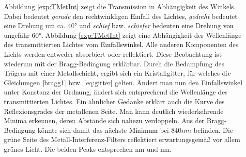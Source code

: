         Abbildung \ref{exp:TMetInt} zeigt die Transmission in Abhängigkeit des Winkels. Dabei bedeutet \textit{gerade} den rechtwinkligen Einfall des Lichtes, \textit{gedreht} bedeutet eine Drehung um ca. $40\unit{°}$ und \textit{schief} bzw. \textit{schiefer} bedeuten eine Drehung von ungefähr $60\unit{°}$. Abbildung \ref{exp:TMetInt} zeigt eine Abhängigkeit der Wellenlänge des transmittierten Lichtes vom Einfallswinkel. Alle anderen Komponenten des Lichts werden entweder absorbiert oder reflektiert. Diese Beobachtung ist wiederum mit der Bragg-Bedingung erklärbar. Durch die Bedampfung des Trägers mit einer Metallschicht, ergibt sich ein Kristallgitter, für welches die Gleichungen \ref{bragg1} bzw. \ref{eq:gitter} gelten. Ändert man nun den Einfallswinkel unter Konstanz der Ordnung, ändert sich entsprechend die Wellenlänge des transmittierten Lichtes.
        Ein ähnlicher Gedanke erklärt auch die Kurve des Reflexionsgrades der metallenen Seite. Man kann deutlich wiederkehrende Minima erkennen, deren Abstände sich nahezu verdoppeln. Aus der Bragg-Bedingung könnte sich damit das nächste Minimum bei $840\unit{nm}$ befinden.
        Die grüne Seite des Metall-Interferenz-Filters reflektiert erwartungsgemäß vor allem grünes Licht. Die beiden Peaks entsprechen \unit[525]{nm} und \unit[575]{nm}.
